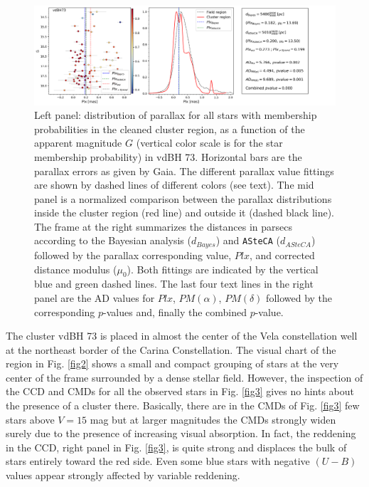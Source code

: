 \documentclass[draft]{aa}
\begin{document}
\begin{figure}[ht]
    \centering
    \includegraphics[width=\hsize]{../figs/plx_vdBH73.png}
    \caption{Left panel: distribution of parallax for all stars with membership
    probabilities in the cleaned cluster region, as a function of the apparent
    magnitude $G$ (vertical color scale is for the star membership
    probability) in vdBH 73.
    Horizontal bars are the parallax errors as given by Gaia. The different
    parallax value fittings are shown by dashed lines of different colors (see
    text). The mid panel is a normalized comparison between the parallax
    distributions inside the cluster region (red line) and outside it (dashed
    black line). The frame at the right summarizes the distances in parsecs
    according to the Bayesian analysis ($d_{Bayes}$) and \texttt{ASteCA} ($d_
    {ASteCA}$) followed by the parallax corresponding value, $Plx$, and
    corrected distance modulus ($\mu_0$). Both fittings are indicated by the
    vertical blue and green dashed lines. The last four text lines in the right
    panel are the AD values for $Plx$, $PM(\alpha)$, $PM(\delta)$ followed by
    the corresponding $p$-values and, finally the combined $p$-value.}
    \label{fig6}
\end{figure}

The cluster vdBH 73 is placed in almost the center of the Vela
constellation well at the northeast border of the Carina Constellation. The
visual chart of the region in Fig. \ref{fig2} shows a small and compact grouping
of stars at the very center of the frame surrounded by a dense stellar field.
However, the inspection of the CCD and CMDs for all the observed stars in
Fig. \ref{fig3} gives no hints about the presence of a
cluster there. Basically, there are in the CMDs of Fig. \ref{fig3} few stars
above $V=15$ mag but at larger magnitudes the CMDs strongly widen surely due to
the presence of increasing visual absorption. In fact, the reddening in the
CCD, right panel in Fig. \ref{fig3}, is quite strong and displaces the bulk of
stars entirely toward the red side. Even some blue stars with negative $(U-B)$
values appear strongly affected by variable reddening.\\
\end{document}
